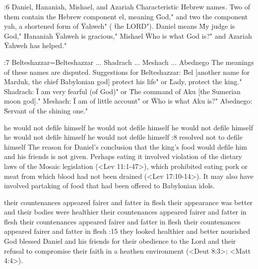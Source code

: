 :6 {Daniel, Hananiah, Mishael, and Azariah} Characteristic Hebrew names. Two of them contain
the Hebrew component el,  meaning \"God," and two the component yah, a shortened form of 
 \"Yahweh" ( \"the LORD"). Daniel means  \"My judge is God," Hananiah  \"Yahweh is gracious,"
Mishael  \"Who is what God is?" and Azariah  \"Yahweh has helped."

:7 {Belteshazzar}={Belteshazzar ... Shadrach ...   Meshach ...  Abednego}
The meanings of these names are disputed. Suggestions for Belteshazzar:
 \"Bel [another name for Marduk, the chief Babylonian 
god] protect his life" or \"Lady, protect the king." Shadrach: \"I am 
very fearful (of God)" or \"The command of Aku [the Sumerian 
moon god]." Meshach: \"I am of little account" or \"Who is what 
Aku is?" Abednego: \"Servant of the shining one."


    {he would not defile himself} %
    {he would not defile himself} %
    {he would not defile himself} %
    {he would not defile himself} %
    {he would not defile himself} %
:8 {resolved not to defile himself} The reason for Daniel's conclusion that the king's food
would defile him and his friends is not  
given. Perhaps eating it involved violation of the dietary laws of the 
Mosaic legislation (<Lev 11:1-47>), which prohibited eating pork or 
meat from which blood had not been drained (<Lev 17:10-14>). It 
may also have involved partaking of food that had been offered to 
Babylonian idols.


    {their countenances appeared fairer and fatter in flesh} %
    {their appearance was better and their bodies were healthier} %
    {their countenances appeared fairer and fatter in flesh} %
    {their countenances appeared fairer and fatter in flesh} %
    {their countenances appeared fairer and fatter in flesh} %
:15 {they looked healthier and better nourished} 
God blessed Daniel and his friends for their obedience to the Lord and their refusal to
compromise their faith in a heathen environment (<Deut 8:3>; <Matt 4:4>).


